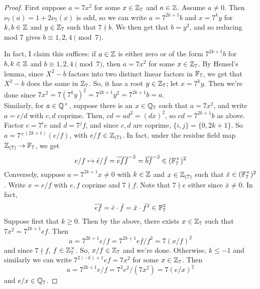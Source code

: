 \begin{proof}
	First suppose $a = 7x^2$ for some $x \in \mathbb{Z}_7$ and $a \in \mathbb{Z}$. Assume $a \neq 0$. Then $\nu_7(a) = 1+2\nu_7(x)$ is odd, so we can write $a = 7^{2k+1}b$ and $x = 7^ky$ for $k,b \in \mathbb{Z}$ and $y \in \mathbb{Z}_7$ such that $7 \nmid b$. We then get that $b = y^2$, and so reducing mod 7 gives $b \equiv 1,2,4 \pmod{7}$.
	
	In fact, I claim this suffices: if $a \in \mathbb{Z}$ is either zero or of the form $7^{2k+1}b$ for $b,k \in \mathbb{Z}$ and $b \equiv 1,2,4 \pmod{7}$, then $a = 7x^2$ for some $x \in \mathbb{Z}_7$. By Hensel's lemma, since $X^2-\overline{b}$ factors into two distinct linear factors in $\mathbb{F}_7$, we get that $X^2-b$ does the same in $\mathbb{Z}_7$. So, it has a root $y \in \mathbb{Z}_7$; let $x = 7^ky$. Then we're done since $7x^2 = 7(7^ky)^2 = 7^{2k+1}y^2 = 7^{2k+1}b = a$. \\
	
	Similarly, for $a \in \mathbb{Q}^\times$, suppose there is an $x \in \mathbb{Q}_7$ such that $a = 7x^2$, and write $a = c/d$ with $c,d$ coprime. Then, $cd = ad^2 = (dx)^2$, so $cd = 7^{2k+1}b$ as above. Factor $c = 7^ie$ and $d = 7^jf$, and since $c,d$ are coprime, $\{i,j\} = \{0,2k+1\}$. So $a = 7^{\pm(2k+1)}(e/f)$, with $e/f \in \mathbb{Z}_{(7)}$. In fact, under the residue field map $\mathbb{Z}_{(7)} \to \mathbb{F}_7$, we get
	\[ e/f \mapsto \bar{e}/\bar{f} = \overline{ef}\overline{f}^{-2} = \overline{b}\overline{f}^{-2} \in (\mathbb{F}_7^\times)^2 \]
	Conversely, suppose $a = 7^{2k+1}x \neq 0$ with $k \in \mathbb{Z}$ and $x \in \mathbb{Z}_{(7)}$ such that $\bar{x} \in (\mathbb{F}_7^\times)^2$. Write $x = e/f$ with $e,f$ coprime and $7 \nmid f$. Note that $7 \nmid e$ either since $\bar{x} \neq 0$. In fact,
	\[ \overline{ef} = \bar{e} \cdot \bar{f} = \bar{x} \cdot \bar{f}^2 \in \mathbb{F}_7^2 \]
	Suppose first that $k \geq 0$. Then by the above, there exists $x \in \mathbb{Z}_7$ such that $7x^2 = 7^{2k+1}ef$. Then
	\[ a = 7^{2k+1}e/f = 7^{2k+1}ef/f^2 = 7(x/f)^2 \]
	and since $7 \nmid f$, $f \in \mathbb{Z}_7^\times$. So, $x/f \in \mathbb{Z}_7$ and we're done. Otherwise, $k \leq -1$ and similarly we can write $7^{2(-k)+1}ef = 7x^2$ for some $x \in \mathbb{Z}_7$. Then
	\[ a = 7^{2k+1}e/f = 7^2e^2/(7x^2) = 7(e/x)^2 \]
	and $e/x \in \mathbb{Q}_7$.
\end{proof}
